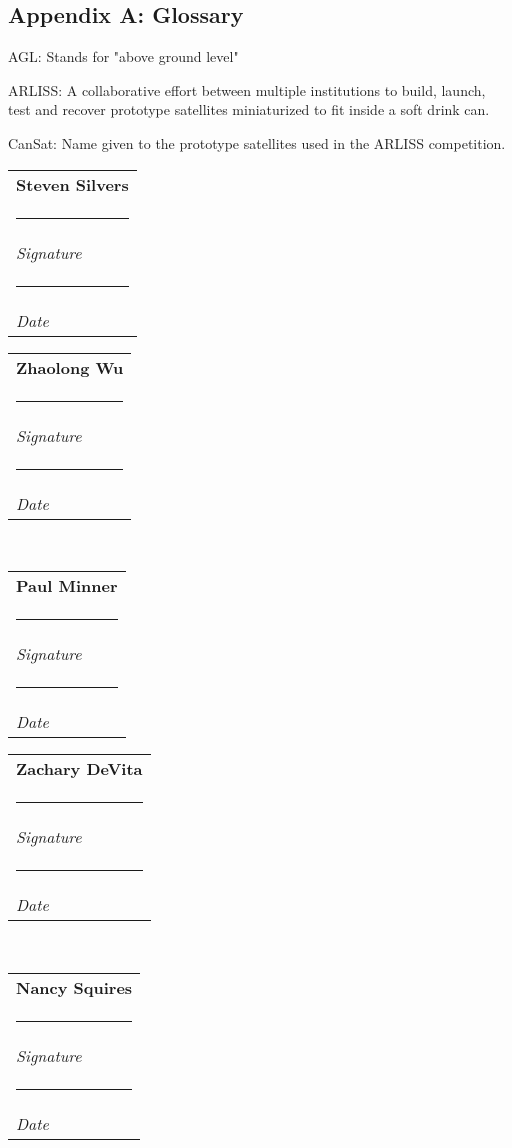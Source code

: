 \documentclass[10pt,onecolumn,draftclsnofoot,document]{IEEEtran}
\makeatletter
\newenvironment{hangingpar}[1]
{\begin{list}
          {}{
		\setlength{\itemindent}{-#1}
           	\setlength{\leftmargin}{#1}
           	\setlength{\itemsep}{0pt}
           	\setlength{\parsep}{\parskip}
           	\setlength{\topsep}{\parskip}
           }
    	\setlength{\parindent}{-#1}%
    	\item[]
}
{\end{list}}
\newcommand{\namesigdate}[2][8cm]{
  	\begin{tabular}{@{}p{#1}@{}}
    		#2 \\[3\normalbaselineskip] \hrule \\[0pt]
    		{\small \textit{Signature}} 
		\\[2\normalbaselineskip] \hrule \\[0pt]
    		{\small \textit{Date}}
  	\end{tabular}
}
\makeatother
\begin{document}
\subsection{Appendix A: Glossary}

\begin{hangingpar}{3em}{}
\vspace{.7cm}
AGL:  Stands for "above ground level"\\
\par
ARLISS: A collaborative effort between multiple institutions to build, launch, test and recover prototype satellites miniaturized to fit inside a soft drink can.\\
\par
CanSat: Name given to the prototype satellites used in the ARLISS competition.\\


\end{hangingpar}
\clearpage






{}
\vspace{1in}
\noindent \namesigdate{\textbf{Steven Silvers}}
\hfill
\vspace{1in}
\noindent \namesigdate{\textbf{Zhaolong Wu}}
\\
\vspace{1in}
\noindent \namesigdate{\textbf{Paul Minner}}
\hfill
\vspace{1in}
\noindent \namesigdate{\textbf{Zachary DeVita}}
\\
\noindent \namesigdate{\textbf{Nancy Squires}}
\end{document}
